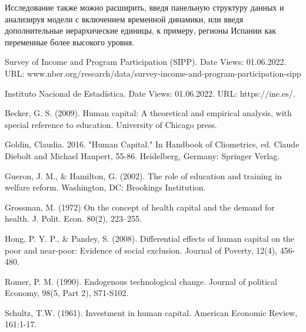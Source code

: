 \documentclass[a4paper]{article}
\begin{document}
Исследование также можно расширить, введя панельную структуру данных и анализируя модели с включением временной динамики, или введя дополнительные иерархические единицы, к примеру, регионы Испании как переменные более высокого уровня. 
\newpage
{}
\begin{thebibliography}{20}
	
 Survey of Income and Program Participation (SIPP). Date Views: 01.06.2022. URL:   www.nber.org/research/data/survey-income-and-program-participation-sipp

 Instituto Nacional de Estadística. Date Views: 01.06.2022. URL: https://ine.es/.

 Becker, G. S. (2009). Human capital: A theoretical and empirical analysis, with special reference to education. University of Chicago press. 

 Goldin, Claudia. 2016. "Human Capital." In Handbook of Cliometrics, ed. Claude Diebolt and Michael Haupert, 55-86. Heidelberg, Germany: Springer Verlag.

 Gueron, J. M., \& Hamilton, G. (2002). The role of education and training in welfare reform. Washington, DC: Brookings Institution.

 Grossman, M. (1972) On the concept of health capital and the demand for health. J. Polit. Econ. 80(2), 223–255.

 Hong, P. Y. P., \& Pandey, S. (2008). Differential effects of human capital on the poor and near-poor: Evidence of social exclusion. Journal of Poverty, 12(4), 456-480.

 Romer, P. M. (1990). Endogenous technological change. Journal of political Economy, 98(5, Part 2), S71-S102. 

 Schultz, T.W. (1961). Investment in human capital. American Economic Review, 161:1-17. 


\end{thebibliography}
\end{document}
